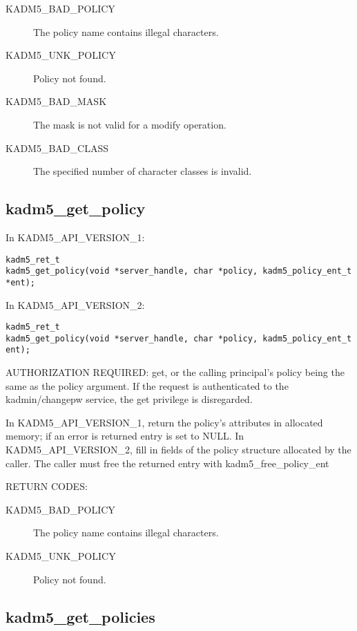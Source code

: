 \begin{description}
\item[KADM5_BAD_POLICY] The policy name contains illegal characters.
\item[KADM5_UNK_POLICY] Policy not found.
\item[KADM5_BAD_MASK] The mask is not valid for a modify
operation.
\item[KADM5_BAD_CLASS] The specified number of character classes
is invalid.
\end{description}

\subsection{kadm5_get_policy}

In KADM5_API_VERSION_1:

\begin{verbatim}
kadm5_ret_t
kadm5_get_policy(void *server_handle, char *policy, kadm5_policy_ent_t *ent); 
\end{verbatim}

In KADM5_API_VERSION_2:

\begin{verbatim}
kadm5_ret_t
kadm5_get_policy(void *server_handle, char *policy, kadm5_policy_ent_t ent); 
\end{verbatim}

AUTHORIZATION REQUIRED: get, or the calling principal's policy being
the same as the policy argument.  If the request is authenticated to
the kadmin/changepw service, the get privilege is disregarded.

In KADM5_API_VERSION_1, return the policy's attributes in allocated
memory; if an error is returned entry is set to NULL.  In
KADM5_API_VERSION_2, fill in fields of the policy structure allocated
by the caller.  The caller must free the returned entry with
kadm5_free_policy_ent

RETURN CODES: 

\begin{description}
\item[KADM5_BAD_POLICY] The policy name contains illegal characters.
\item[KADM5_UNK_POLICY] Policy not found.
\end{description}

\subsection{kadm5_get_policies}

